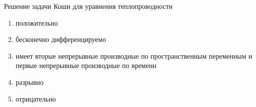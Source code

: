 Решение задачи Коши для уравнения теплопроводности

\begin{enumerate}[label=\arabic*)]
    \item положительно
    \item бесконечно дифференцируемо
    \item имеет вторые непрерывные производные по пространственным переменным и первые непрерывные производные по времени
    \item разрывно
    \item отрицательно
\end{enumerate}

